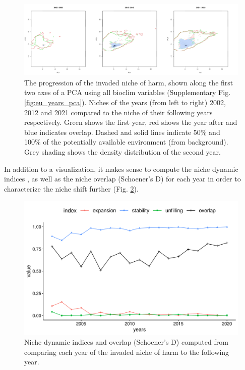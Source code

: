 \documentclass[12pt,a4paper]{article}
\begin{document}
\begin{figure}[!h]
    \centering
    \includegraphics[width = \linewidth]{"../../R/figures/eu-niche-ys.png"}
    \caption{\label{fig:eu_niche_ys} The progression of the invaded niche of \gls{harm}, shown along the first two axes of a PCA using all bioclim variables (Supplementary Fig. \ref{fig:eu_years_pca}). Niches of the years (from left to right) 2002, 2012 and 2021 compared to the niche of their following years respectively. Green shows the first year, red shows the year after and blue indicates overlap. Dashed and solid lines indicate 50\% and 100\% of the potentially available environment (from background). Grey shading shows the density distribution of the second year.}

\end{figure}

In addition to a visualization, it makes sense to compute the niche dynamic indices \autocite{guisan2014nichedyn}, as well as the niche overlap (Schoener's D) for each year in order to characterize the niche shift further (Fig. \ref{fig:eu_niche_dyn}).

\begin{figure}[!h]
    \centering
    \includegraphics[width = 0.9\linewidth]{"../../R/figures/eu-niche-dyn.png"}
    \caption{\label{fig:eu_niche_dyn} Niche dynamic indices and overlap (Schoener's D) computed from comparing each year of the invaded niche of \gls{harm} to the following year.}
\end{figure}
\end{document}
